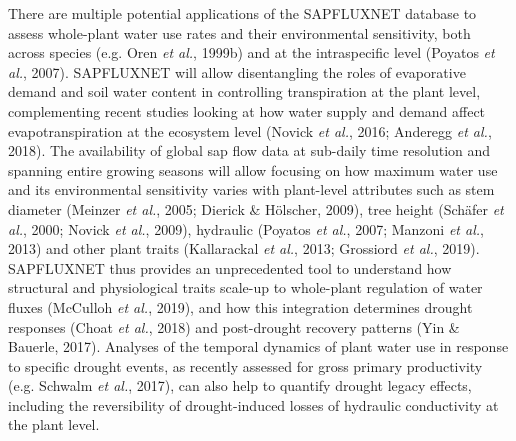 \documentclass[11pt,twoside]{reedthesis}
\begin{document}
There are multiple potential applications of the SAPFLUXNET database to
assess whole-plant water use rates and their environmental sensitivity,
both across species (e.g. Oren \emph{et al.}, 1999b) and at the
intraspecific level (Poyatos \emph{et al.}, 2007). SAPFLUXNET will allow
disentangling the roles of evaporative demand and soil water content in
controlling transpiration at the plant level, complementing recent
studies looking at how water supply and demand affect evapotranspiration
at the ecosystem level (Novick \emph{et al.}, 2016; Anderegg \emph{et
al.}, 2018). The availability of global sap flow data at sub-daily time
resolution and spanning entire growing seasons will allow focusing on
how maximum water use and its environmental sensitivity varies with
plant-level attributes such as stem diameter (Meinzer \emph{et al.},
2005; Dierick \& Hölscher, 2009), tree height (Schäfer \emph{et al.},
2000; Novick \emph{et al.}, 2009), hydraulic (Poyatos \emph{et al.},
2007; Manzoni \emph{et al.}, 2013) and other plant traits (Kallarackal
\emph{et al.}, 2013; Grossiord \emph{et al.}, 2019). SAPFLUXNET thus
provides an unprecedented tool to understand how structural and
physiological traits scale-up to whole-plant regulation of water fluxes
(McCulloh \emph{et al.}, 2019), and how this integration determines
drought responses (Choat \emph{et al.}, 2018) and post-drought recovery
patterns (Yin \& Bauerle, 2017). Analyses of the temporal dynamics of
plant water use in response to specific drought events, as recently
assessed for gross primary productivity (e.g. Schwalm \emph{et al.},
2017), can also help to quantify drought legacy effects, including the
reversibility of drought-induced losses of hydraulic conductivity at the
plant level.\par
\end{document}
